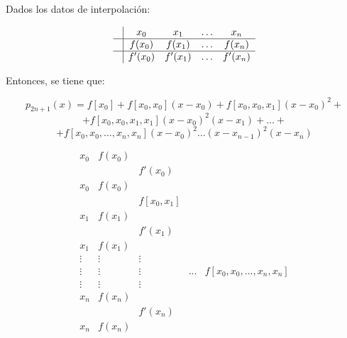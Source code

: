 \bigskip
\begin{teo}
    Dados los datos de interpolación:

    $$\begin{array}{c|cccc}
             & x_0     & x_1     & \ldots & x_n     \\
            \hline
             & f(x_0)  & f(x_1)  & \ldots & f(x_n)  \\
            \hline
             & f'(x_0) & f'(x_1) & \ldots & f'(x_n)
        \end{array}$$

    Entonces, se tiene que:

    $$p_{2n+1}(x) = f[x_0]+f[x_0,x_0](x-x_0) + f[x_0,x_0,x_1](x-x_0)^2 + $$
    $$ + f[x_0,x_0,x_1,x_1](x-x_0)^2(x-x_1) + \ldots + $$
    $$ + f[x_0,x_0,\ldots, x_n,x_n](x-x_0)^2\ldots (x-x_{n-1})^2(x-x_n)$$

    \smallskip

    $$\begin{array}{c|cccc}
            x_0    & f(x_0) &            &        &                               \\
                   &        & f'(x_0)    &        &                               \\
            x_0    & f(x_0) &            &        &                               \\
                   &        & f[x_0,x_1] &        &                               \\
            x_1    & f(x_1) &            &        &                               \\
                   &        & f'(x_1)    &        &                               \\
            x_1    & f(x_1) &            &        &                               \\
            \vdots & \vdots & \vdots     &        &                               \\
            \vdots & \vdots & \vdots     & \ldots & f[x_0, x_0, \ldots, x_n, x_n] \\
            \vdots & \vdots & \vdots     &        &                               \\
            x_n    & f(x_n) &            &        &                               \\
                   &        & f'(x_n)    &        &                               \\
            x_n    & f(x_n) &            &        &
        \end{array}$$
\end{teo}

